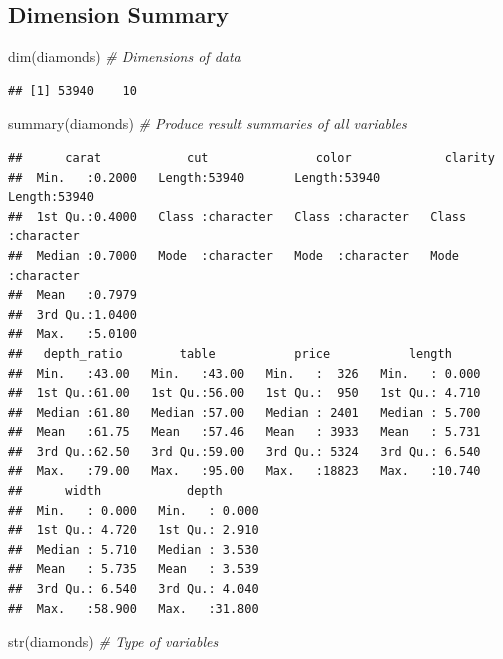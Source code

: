 \documentclass[
]{article}
\newenvironment{Shaded}{\begin{snugshade}}{\end{snugshade}}
\newcommand{\CommentTok}[1]{\textcolor[rgb]{0.56,0.35,0.01}{\textit{#1}}}
\newcommand{\FunctionTok}[1]{\textcolor[rgb]{0.00,0.00,0.00}{#1}}
\newcommand{\NormalTok}[1]{#1}
\begin{document}
\hypertarget{dimension-summary}{%
\subsection{Dimension Summary}\label{dimension-summary}}

\begin{Shaded}
\begin{Highlighting}[]
\FunctionTok{dim}\NormalTok{(diamonds) }\CommentTok{\# Dimensions of data}
\end{Highlighting}
\end{Shaded}

\begin{verbatim}
## [1] 53940    10
\end{verbatim}

\begin{Shaded}
\begin{Highlighting}[]
\FunctionTok{summary}\NormalTok{(diamonds) }\CommentTok{\# Produce result summaries of all variables}
\end{Highlighting}
\end{Shaded}

\begin{verbatim}
##      carat            cut               color             clarity
##  Min.   :0.2000   Length:53940       Length:53940       Length:53940
##  1st Qu.:0.4000   Class :character   Class :character   Class :character
##  Median :0.7000   Mode  :character   Mode  :character   Mode  :character
##  Mean   :0.7979
##  3rd Qu.:1.0400
##  Max.   :5.0100
##   depth_ratio        table           price           length
##  Min.   :43.00   Min.   :43.00   Min.   :  326   Min.   : 0.000
##  1st Qu.:61.00   1st Qu.:56.00   1st Qu.:  950   1st Qu.: 4.710
##  Median :61.80   Median :57.00   Median : 2401   Median : 5.700
##  Mean   :61.75   Mean   :57.46   Mean   : 3933   Mean   : 5.731
##  3rd Qu.:62.50   3rd Qu.:59.00   3rd Qu.: 5324   3rd Qu.: 6.540
##  Max.   :79.00   Max.   :95.00   Max.   :18823   Max.   :10.740
##      width            depth
##  Min.   : 0.000   Min.   : 0.000
##  1st Qu.: 4.720   1st Qu.: 2.910
##  Median : 5.710   Median : 3.530
##  Mean   : 5.735   Mean   : 3.539
##  3rd Qu.: 6.540   3rd Qu.: 4.040
##  Max.   :58.900   Max.   :31.800
\end{verbatim}

\begin{Shaded}
\begin{Highlighting}[]
\FunctionTok{str}\NormalTok{(diamonds) }\CommentTok{\# Type of variables}
\end{Highlighting}
\end{Shaded}
\end{document}
